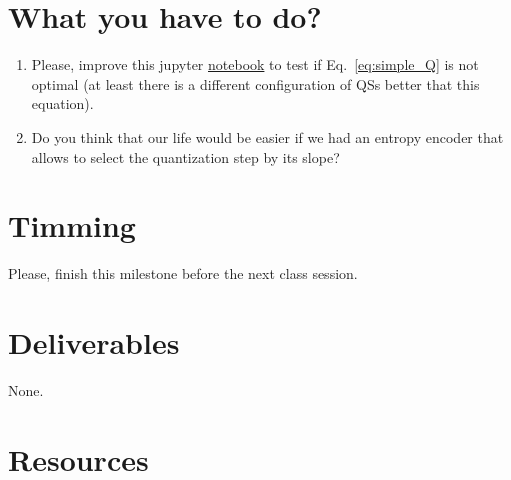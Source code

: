 \section{What you have to do?}
\begin{enumerate}
\item Please, improve this jupyter
  \href{https://github.com/Sistemas-Multimedia/Sistemas-Multimedia.github.io/blob/master/study_guide/05-quantization/performance.ipynb}{notebook}
  to test if Eq.~\ref{eq:simple_Q} is not optimal (at least there is a
  different configuration of QSs better that this equation).
\item Do you think that our life would be easier if we had an entropy
  encoder that allows to select the quantization step by its slope?
\end{enumerate}

\section{Timming}

Please, finish this milestone before the next class session.

\section{Deliverables}

None.

\section{Resources}



